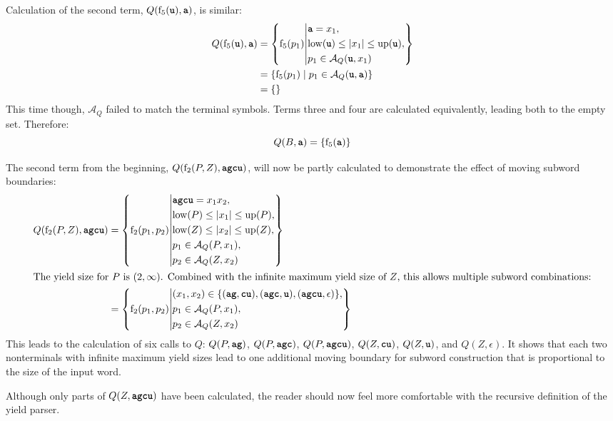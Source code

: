\documentclass[
    a4paper,
    12pt,
    twoside,
    BCOR=12mm,
    parskip=half,
    chapterprefix,
    numbers=noenddot,
    bibliography=totoc
]{scrbook}
\begin{document}
\begin{example}
  \pagebreak
  Calculation of the second term, $Q(\op{f}_5(\ts{u}),\ts{a})$, is similar:
  \begin{align*}
    Q(\op{f}_5(\ts{u}),\ts{a}) &= \left\{ \op{f}_5(p_1) \middle\vert
      \begin{aligned}
				&\ts{a}=x_1,\\
				&\op{low}(\ts{u}) \leq |x_1| \leq \op{up}(\ts{u}),\\
				&p_1 \in \mathcal{A}_Q(\ts{u},x_1)
      \end{aligned}
		\right\}\\
    &= \{ \op{f}_5(p_1) \mid p_1 \in \mathcal{A}_Q(\ts{u},\ts{a}) \}\\
    &= \{ \}
  \end{align*}
  This time though, $\mathcal{A}_Q$ failed to match the terminal symbols. Terms three and four are calculated equivalently, leading both to the empty set. Therefore:
  \[ Q(B,\ts{a}) = \{ \op{f}_5(\ts{a}) \} \]
  
  The second term from the beginning, $Q(\op{f}_2(P,Z),\ts{agcu})$, will now be partly calculated to demonstrate the effect of moving subword boundaries:
  \begin{align*}
    Q(\op{f}_2(P,Z),\ts{agcu}) &= \left\{ \op{f}_2(p_1,p_2) \middle\vert
      \begin{aligned}
				&\ts{agcu}=x_1 x_2,\\
				&\op{low}(P) \leq |x_1| \leq \op{up}(P),\\
        &\op{low}(Z) \leq |x_2| \leq \op{up}(Z),\\
				&p_1 \in \mathcal{A}_Q(P,x_1),\\
        &p_2 \in \mathcal{A}_Q(Z,x_2)
      \end{aligned}
		\right\}\\
    \intertext{The yield size for $P$ is $(2,\infty)$. Combined with the infinite maximum yield size of $Z$, this allows multiple subword combinations:}
    &= \left\{ \op{f}_2(p_1,p_2) \middle\vert
      \begin{aligned}
        &(x_1,x_2) \in \{ (\ts{ag},\ts{cu}), (\ts{agc},\ts{u}), (\ts{agcu}, \epsilon) \},\\
				&p_1 \in \mathcal{A}_Q(P,x_1),\\
        &p_2 \in \mathcal{A}_Q(Z,x_2)
      \end{aligned}
		\right\}
  \end{align*}
  This leads to the calculation of six calls to $Q$: $Q(P,\ts{ag})$, $Q(P,\ts{agc})$, $Q(P,\ts{agcu})$, $Q(Z,\ts{cu})$, $Q(Z,\ts{u})$, and $Q(Z,\epsilon)$. It shows that each two nonterminals with infinite maximum yield sizes lead to one additional moving boundary for subword construction that is proportional to the size of the input word.
  
  Although only parts of $Q(Z,\ts{agcu})$ have been calculated, the reader should now feel more comfortable with the recursive definition of the yield parser.
\end{example}
\end{document}
